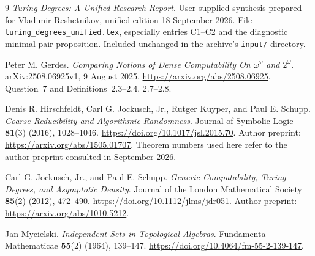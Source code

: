 \documentclass[11pt,a4paper]{article}
\newcommand{\code}[1]{\texttt{#1}}
\theoremstyle{definition}\newtheorem{definition}[theorem]{Definition}
\theoremstyle{remark}\newtheorem{remark}[theorem]{Remark}
\begin{document}
\clearpage
\begingroup\raggedright
\begin{thebibliography}{9}
\emph{Turing Degrees: A Unified Research Report}.
User-supplied synthesis prepared for Vladimir Reshetnikov, unified edition 18 September 2026.
File \code{turing\_degrees\_unified.tex}, especially entries C1--C2 and the diagnostic minimal-pair proposition. Included unchanged in the archive's \code{input/} directory.

Peter M. Gerdes.
\emph{Comparing Notions of Dense Computability On $\omega^\omega$ and $2^\omega$}.
arXiv:2508.06925v1, 9 August 2025.
\url{https://arxiv.org/abs/2508.06925}.
Question~7 and Definitions~2.3--2.4, 2.7--2.8.

Denis R. Hirschfeldt, Carl G. Jockusch, Jr., Rutger Kuyper, and Paul E. Schupp.
\emph{Coarse Reducibility and Algorithmic Randomness}.
Journal of Symbolic Logic \textbf{81}(3) (2016), 1028--1046.
\url{https://doi.org/10.1017/jsl.2015.70}.
Author preprint: \url{https://arxiv.org/abs/1505.01707}.
Theorem numbers used here refer to the author preprint consulted in September 2026.

Carl G. Jockusch, Jr., and Paul E. Schupp.
\emph{Generic Computability, Turing Degrees, and Asymptotic Density}.
Journal of the London Mathematical Society \textbf{85}(2) (2012), 472--490.
\url{https://doi.org/10.1112/jlms/jdr051}.
Author preprint: \url{https://arxiv.org/abs/1010.5212}.

Jan Mycielski.
\emph{Independent Sets in Topological Algebras}.
Fundamenta Mathematicae \textbf{55}(2) (1964), 139--147.
\url{https://doi.org/10.4064/fm-55-2-139-147}.
\end{thebibliography}
\endgroup
\end{document}
